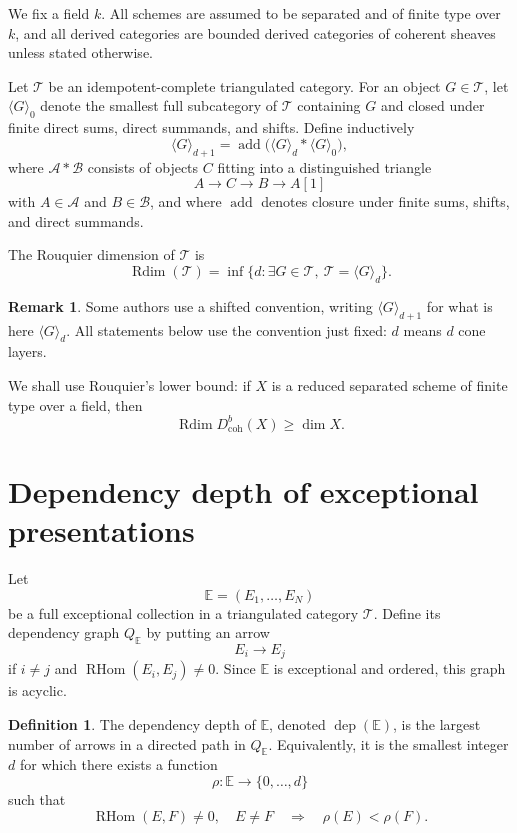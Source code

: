 \documentclass[11pt]{amsart}
\numberwithin{equation}{section}
\theoremstyle{definition}
\newtheorem{definition}[theorem]{Definition}
\newtheorem{remark}[theorem]{Remark}
\DeclareMathOperator{\Rdim}{Rdim}
\DeclareMathOperator{\RHom}{RHom}
\DeclareMathOperator{\dep}{dep}
\newcommand{\Db}{D^b_{\mathrm{coh}}}
\begin{document}
We fix a field $k$. All schemes are assumed to be separated and of finite type over $k$, and all derived categories are bounded derived categories of coherent sheaves unless stated otherwise.

Let $\mathcal T$ be an idempotent-complete triangulated category. For an object $G\in\mathcal T$, let $\langle G\rangle_0$ denote the smallest full subcategory of $\mathcal T$ containing $G$ and closed under finite direct sums, direct summands, and shifts. Define inductively
\[
\langle G\rangle_{d+1}
=
\operatorname{add}\bigl(\langle G\rangle_d * \langle G\rangle_0\bigr),
\]
where $\mathcal A*\mathcal B$ consists of objects $C$ fitting into a distinguished triangle
\[
A\to C\to B\to A[1]
\]
with $A\in\mathcal A$ and $B\in\mathcal B$, and where $\operatorname{add}$ denotes closure under finite sums, shifts, and direct summands.

The Rouquier dimension of $\mathcal T$ is
\[
\Rdim(\mathcal T)=
\inf\{d:\exists G\in\mathcal T,\ \mathcal T=\langle G\rangle_d\}.
\]

\begin{remark}
Some authors use a shifted convention, writing $\langle G\rangle_{d+1}$ for what is here $\langle G\rangle_d$. All statements below use the convention just fixed: $d$ means $d$ cone layers.
\end{remark}

We shall use Rouquier's lower bound: if $X$ is a reduced separated scheme of finite type over a field, then
\[
\Rdim \Db(X)\ge \dim X.
\]

\section{Dependency depth of exceptional presentations}

Let
\[
\mathbb E=(E_1,\dots,E_N)
\]
be a full exceptional collection in a triangulated category $\mathcal T$. Define its dependency graph $Q_{\mathbb E}$ by putting an arrow
\[
E_i\longrightarrow E_j
\]
if $i\ne j$ and $\RHom(E_i,E_j)\ne0$. Since $\mathbb E$ is exceptional and ordered, this graph is acyclic.

\begin{definition}
The dependency depth of $\mathbb E$, denoted $\dep(\mathbb E)$, is the largest number of arrows in a directed path in $Q_{\mathbb E}$. Equivalently, it is the smallest integer $d$ for which there exists a function
\[
\rho:\mathbb E\to\{0,\dots,d\}
\]
such that
\[
\RHom(E,F)\ne0,\quad E\ne F
\quad\Longrightarrow\quad
\rho(E)<\rho(F).
\]
\end{definition}
\end{document}
